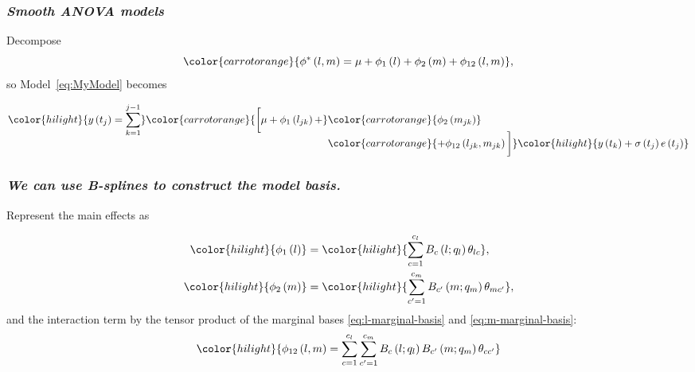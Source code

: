 \documentclass[12pt]{beamer}
\newcommand{\newmaththought}[1]{{ \color{hilight} {#1}}}
\newcommand{\carrotorangemath}[1]{{ \color{carrotorange} {#1}}}
\begin{document}
\begin{frame}
\frametitle{\emph{Smooth ANOVA models}}
Decompose
\begin{equation} \label{eq:SANOVA-model}
\carrotorangemath{
\phi^*\left(l,m\right) = \mu + \phi_1\left(l\right) + \phi_2\left(m\right) + \phi_{12}\left(l,m\right)},
\end{equation} 
so Model~\ref{eq:MyModel} becomes

\begin{align}  
\begin{split} \label{eq:expanded-ps-anova-vc-model}
\newmaththought{ y\left(t_j \right)  = \sum_{k=1}^{j-1}}\carrotorangemath{ \bigg[\mu + \phi_1\left(l_{jk}\right) + } &\carrotorangemath{\phi_2\left(m_{jk}\right)} \bigg.\\[-2ex]
\bigg. &\carrotorangemath{+ \phi_{12}\left(l_{jk},m_{jk}\right) \bigg]}\newmaththought{y\left(t_k\right)+ \sigma\left(t_j\right)e\left({t_j}\right)}
\end{split}
\end{align}
\end{frame}


\begin{frame}
\frametitle{\emph{We can use B-splines to construct the model basis.}}
Represent the main effects as

\begin{align}  
\begin{split}\label{eq:l-m-marginal-basis}
\newmaththought{\phi_1\left(l\right) } &= \newmaththought{\sum_{c=1}^{c_l} B_{c}\left(l;q_l\right) \theta_{lc }}, \\
\newmaththought{\phi_2\left(m\right) } &= \newmaththought{\sum_{{c^\prime}=1}^{c_m} B_{c^\prime}\left(m;q_m\right)\theta_{mc^\prime } },
\end{split}
\end{align}
and the interaction term by the tensor product of the marginal bases \ref{eq:l-marginal-basis} and \ref{eq:m-marginal-basis}:
\begin{equation} \label{eq:PSANOVA-interaction-term} 
\newmaththought{ \phi_{12}\left(l,m\right)  = \sum_{c=1}^{c_l} \sum_{{c^\prime}=1}^{c_m} B_{c}\left(l;q_l\right) B_{c^\prime  }\left(m;q_m\right)\theta_{c c^\prime } }
\end{equation} 
\end{frame}
\end{document}
